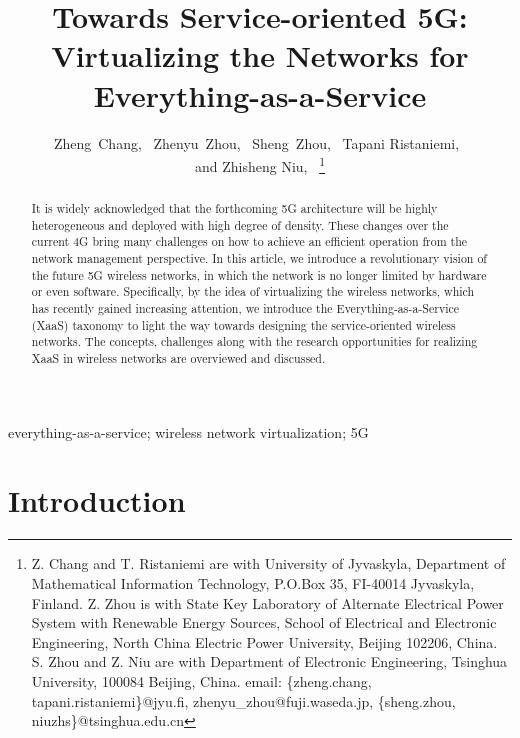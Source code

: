 \documentclass[12pt,draftclsnofoot,onecolumn]{IEEEtran}
\begin{document}
\title{Towards Service-oriented 5G: Virtualizing the Networks for Everything-as-a-Service}
\author{Zheng~Chang,~
Zhenyu~Zhou,~
Sheng~Zhou,~
       Tapani Ristaniemi,~\\
       and  Zhisheng Niu, ~\thanks{Z. Chang and T. Ristaniemi are with University of Jyvaskyla, Department of Mathematical Information Technology, P.O.Box 35, FI-40014 Jyvaskyla, Finland. Z. Zhou is with State Key Laboratory of Alternate Electrical Power System with Renewable Energy
Sources, School of Electrical and Electronic Engineering, North
China Electric Power University, Beijing 102206, China. S. Zhou
and Z. Niu are with Department of Electronic Engineering, Tsinghua
University, 100084 Beijing, China. email: \{zheng.chang, tapani.ristaniemi\}@jyu.fi, zhenyu\_zhou@fuji.waseda.jp, \{sheng.zhou, niuzhs\}@tsinghua.edu.cn}
}
 \maketitle
\begin{abstract}
It is widely acknowledged that the forthcoming 5G architecture
will be highly heterogeneous and deployed with high degree of
density. These changes over the current 4G bring many challenges
on how to achieve an efficient operation from the network
management perspective. In this article, we introduce a
revolutionary vision of the future 5G wireless networks, in which
the network is no longer limited by hardware or even software.
Specifically, by the idea of virtualizing the wireless networks,
which has recently gained increasing attention, we introduce the
Everything-as-a-Service (XaaS) taxonomy to light the way towards
designing the service-oriented wireless networks. The concepts,
challenges along with the research opportunities for realizing
XaaS in wireless networks are overviewed and discussed.
\end{abstract}

\begin{IEEEkeywords}
everything-as-a-service; wireless network virtualization; 5G
\end{IEEEkeywords}


\section{Introduction}
\label{sec:Sec1}
\end{document}
